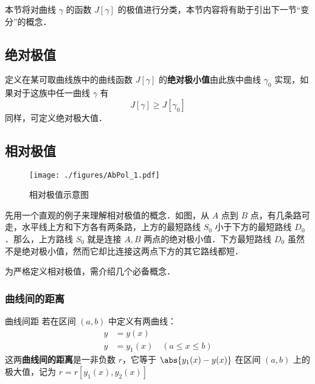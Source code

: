 

本节将对曲线 $\gamma$ 的函数 $J[\gamma]$ 的极值进行分类，本节内容将有助于引出下一节“变分”的概念．

\subsection{绝对极值}
定义在某可取曲线族中的曲线函数 $J[\gamma]$ 的\textbf{绝对极小值}由此族中曲线 $\gamma_0$ 实现，如果对于这族中任一曲线 $\gamma$ 有
\begin{equation}
J[\gamma]\geq J[\gamma_0]
\end{equation}
同样，可定义绝对极大值．
\subsection{相对极值}
\begin{figure}[ht]
\centering
\texttt{[image: ./figures/AbPol\_1.pdf]}
\caption{相对极值示意图} \label{AbPol_fig1}
\end{figure}

先用一个直观的例子来理解相对极值的概念．如图，从 $A$ 点到 $B$ 点，有几条路可走，水平线上方和下方各有两条路，上方的最短路线 $S_0$ 小于下方的最短路线 $D_0$ ．那么，上方路线 $S_0$ 就是连接 $A,B$ 两点的绝对极小值．下方最短路线 $D_0$ 虽然不是绝对极小值，然而它却比连接这两点下方的其它路线都短． 

为严格定义相对极值，需介绍几个必备概念．
\subsubsection{曲线间的距离}
\begin{definition}{曲线间距}
若在区间 $(a,b)$ 中定义有两曲线：
\begin{equation}
\begin{aligned}
y&=y(x)\\
y&=y_1(x)\quad(a\leq x\leq b)
\end{aligned}
\end{equation}
这两\textbf{曲线间的距离}是一非负数 $r$，它等于 $\abs{y_1(x)-y(x)}$ 在区间 $(a,b)$ 上的极大值，记为 $r=r[y_1(x),y_2(x)]$
\end{definition}
